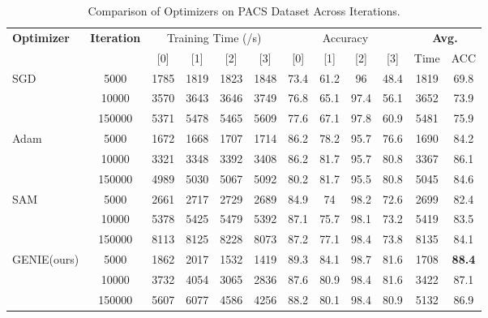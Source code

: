 \documentclass{article}
\theoremstyle{plain}
\theoremstyle{definition}
\theoremstyle{remark}
\begin{document}
\begin{table}[H]
\centering
\caption{Comparison of Optimizers on PACS Dataset Across Iterations.}
\label{tab:pacs_iter}
\vskip 0.15in
\begin{center}
\begin{small}
\begin{sc}
\begin{tabular}{l|c|cccc|cccc|c|c}
\toprule
\textbf{Optimizer}& \textbf{Iteration} & \multicolumn{4}{c}{Training Time (/s)} & \multicolumn{4}{c}{Accuracy} & \multicolumn{2}{c}{\textbf{Avg.}}\\
\cmidrule(lr){3-10}
 & & [0] & [1] & [2] & [3] & [0] & [1] & [2] & [3] & Time & ACC\\ 
\midrule
SGD & 5000 & 1785 & 1819 & 1823 & 1848 & 73.4 & 61.2 & 96 & 48.4 & 1819 & 69.8\\
    & 10000 & 3570 & 3643 & 3646 & 3749 & 76.8 & 65.1 & 97.4 & 56.1 & 3652 & 73.9\\
    & 150000 & 5371 & 5478 & 5465 & 5609 & 77.6 & 67.1 & 97.8 & 60.9 & 5481 & 75.9\\
\midrule
Adam & 5000 & 1672 & 1668 & 1707 & 1714 & 86.2 & 78.2 & 95.7 & 76.6 & 1690 & 84.2\\
     & 10000 & 3321 & 3348 & 3392 & 3408 & 86.2 & 81.7 & 95.7 & 80.8 & 3367 & 86.1\\
     & 150000 & 4989 & 5030 & 5067 & 5092 & 80.2 & 81.7 & 95.5 & 80.8 & 5045 & 84.6\\
\midrule
SAM & 5000 & 2661 & 2717 & 2729 & 2689 & 84.9 & 74 & 98.2 & 72.6 & 2699 & 82.4\\
    & 10000 & 5378 & 5425 & 5479 & 5392 & 87.1 & 75.7 & 98.1 & 73.2 & 5419 & 83.5\\
    & 150000 & 8113 & 8125 & 8228 & 8073 & 87.2 & 77.1 & 98.4 & 73.8 & 8135 & 84.1\\
\midrule
GENIE(ours)& 5000 & 1862 & 2017 & 1532 & 1419 & 89.3 & 84.1 & 98.7 & 81.6 & 1708 & \textbf{88.4}\\
      & 10000 & 3732 & 4054 & 3065 & 2836 & 87.6 & 80.9 & 98.4 & 81.6 & 3422 & 87.1\\
      & 150000 & 5607 & 6077 & 4586 & 4256 & 88.2 & 80.1 & 98.4 & 80.9 & 5132 & 86.9\\
\bottomrule
\end{tabular}
\end{sc}
\end{small}
\end{center}
\vskip -0.1in
\end{table}
\end{document}
